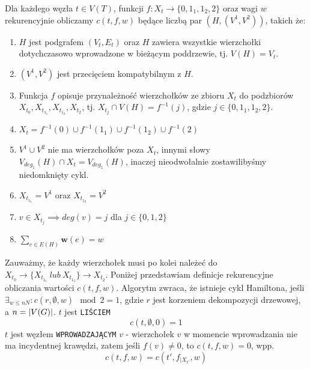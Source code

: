 \documentclass[12pt, oneside]{report}
\begin{document}
Dla każdego węzła $t \in V(T)$, funkcji $f: X_t \to \{0,1_1,1_2,2\}$ oraz wagi $w$ rekurencyjnie obliczamy $c(t,f,w)$ będące liczbą par $(H, (V^1, V^2))$, takich że:

\begin{enumerate}[label=(\roman*)]
\item $H$ jest podgrafem $(V_t, E_t)$ oraz $H$ zawiera wszystkie wierzchołki dotychczasowo wprowadzone w bieżącym poddrzewie, tj. $V(H) = V_t$.
\item $(V^1, V^2)$ jest przecięciem kompatybilnym z $H$.
\item Funkcja $f$ opisuje przynależność wierzchołków ze zbioru $X_t$ do podzbiorów $X_{t_0}, X_{t_{1_1}}, X_{t_{1_2}}, X_{t_2}$, tj. $X_{t_j} \cap V(H) = f^{-1}(j)$, gdzie $j \in \{0,1_1,1_2,2\}$.
\item $X_t = f^{-1}(0) \cup f^{-1}(1_1) \cup f^{-1}(1_2) \cup f^{-1}(2)$
\item $V^1 \cup V^2$ nie ma wierzchołków poza $X_t$, innymi słowy $V_{deg_1}(H) \cap X_t = V_{deg_1}(H)$, inaczej nieodwołalnie zostawilibyśmy niedomknięty cykl.
\item $X_{t_{1_1}} = V^1$ oraz $X_{t_{1_2}} = V^2$
\item $v \in X_{t_j} \implies deg(v) = j$ dla $j \in \{0,1,2\}$
\item $\sum_{e \in E(H)} \mathbf{w}(e) = w$
\end{enumerate}

Zauważmy, że każdy wierzchołek musi po kolei należeć do $X_{t_0} \to \{X_{t_{1_1}} \ lub \ X_{t_{1_2}}\} \to X_{t_2}$. Poniżej przedstawiam definicje rekurencyjne obliczania wartości $c(t,f,w)$. Algorytm zwraca, że istnieje cykl Hamiltona, jeśli $\exists_{w \leq nN}: c(r,\emptyset,w) \mod 2 = 1$, gdzie $r$ jest korzeniem dekompozycji drzewowej, a $n = \abs{V(G)}$.
\newline\newline
$t$ jest \texttt{LIŚCIEM}
$$c(t,\emptyset,0) = 1$$
\newline
$t$ jest węzłem \texttt{WPROWADZAJĄCYM} $v$ - wierzchołek $v$ w momencie wprowadzania nie ma incydentnej krawędzi, zatem jeśli $f(v) \neq 0$, to $c(t,f,w) = 0$, wpp.
$$c(t,f,w) = c(t',f_{\big|X_{t'}},w)$$
\end{document}
